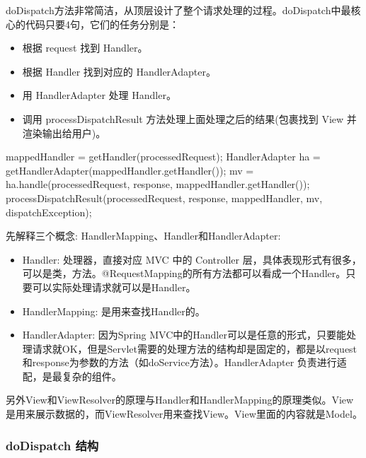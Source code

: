 doDispatch方法非常简洁，从顶层设计了整个请求处理的过程。doDispatch中最核心的代码只要4句，它们的任务分别是：

\begin{itemize}
    \item 根据 request 找到 Handler。
    \item 根据 Handler 找到对应的 HandlerAdapter。
    \item 用 HandlerAdapter 处理 Handler。
    \item 调用 processDispatchResult 方法处理上面处理之后的结果(包裹找到 View 并渲染输出给用户)。
\end{itemize}

\begin{Java}
mappedHandler = getHandler(processedRequest);
HandlerAdapter ha = getHandlerAdapter(mappedHandler.getHandler());
mv = ha.handle(processedRequest, response, mappedHandler.getHandler());
processDispatchResult(processedRequest, response, mappedHandler, mv, dispatchException);
\end{Java}

先解释三个概念: HandlerMapping、Handler和HandlerAdapter:
\begin{itemize}
    \item Handler: 处理器，直接对应 MVC 中的 Controller 层，具体表现形式有很多，可以是类，方法。@RequestMapping的所有方法都可以看成一个Handler。只要可以实际处理请求就可以是Handler。
    \item HandlerMapping: 是用来查找Handler的。
    \item HandlerAdapter: 因为Spring MVC中的Handler可以是任意的形式，只要能处理请求就OK，但是Servlet需要的处理方法的结构却是固定的，都是以request和response为参数的方法（如doService方法）。HandlerAdapter 负责进行适配，是最复杂的组件。
\end{itemize}

另外View和ViewResolver的原理与Handler和HandlerMapping的原理类似。View是用来展示数据的，而ViewResolver用来查找View。View里面的内容就是Model。

\subsubsection{doDispatch 结构}

